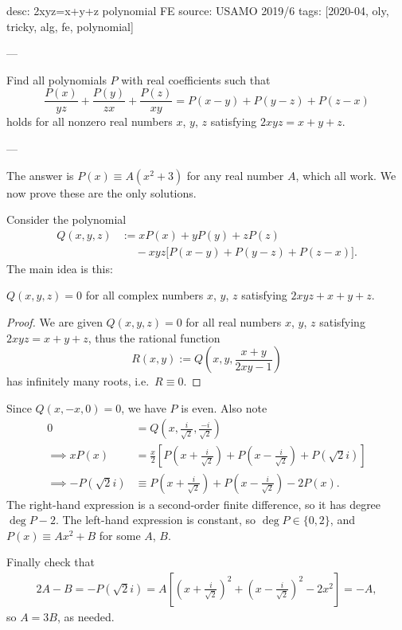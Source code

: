 desc: 2xyz=x+y+z polynomial FE
source: USAMO 2019/6
tags: [2020-04, oly, tricky, alg, fe, polynomial]

---

Find all polynomials $P$ with real coefficients such that \[\frac{P(x)}{yz}+\frac{P(y)}{zx}+\frac{P(z)}{xy}=P(x-y)+P(y-z)+P(z-x)\]
holds for all nonzero real numbers $x$, $y$, $z$ satisfying $2xyz=x+y+z$.

---

The answer is $P(x)\equiv A(x^2+3)$ for any real number $A$, which all work. We now prove these are the only solutions.

Consider the polynomial
\begin{align*}
    Q(x,y,z)&:=xP(x)+yP(y)+zP(z)\\
    &\;\quad-xyz\big[P(x-y)+P(y-z)+P(z-x)\big].
\end{align*}
The main idea is this:
\begin{claim*}
    $Q(x,y,z)=0$ for all complex numbers $x$, $y$, $z$ satisfying $2xyz+x+y+z$.
\end{claim*}
\begin{proof}
We are given $Q(x,y,z)=0$ for all real numbers $x$, $y$, $z$ satisfying $2xyz=x+y+z$, thus the rational function \[R(x,y):=Q\left(x,y,\frac{x+y}{2xy-1}\right)\]
has infinitely many roots, i.e.\ $R\equiv0$.
\end{proof}

Since $Q(x,-x,0)=0$, we have $P$ is even. Also note
\begin{align*}
    0&=Q\left(x,\frac i{\sqrt2},\frac{-i}{\sqrt2}\right)\\
    \implies xP(x)&=\frac x2\left[P\left(x+\frac i{\sqrt2}\right)+P\left(x-\frac i{\sqrt2}\right)+P(\sqrt2i)\right]\\
    \implies-P(\sqrt2i)&\equiv P\left(x+\frac i{\sqrt2}\right)+P\left(x-\frac i{\sqrt2}\right)-2P(x).
\end{align*}
The right-hand expression is a second-order finite difference, so it has degree $\deg P-2$. The left-hand expression is constant, so $\deg P\in\{0,2\}$, and $P(x)\equiv Ax^2+B$ for some $A$, $B$.

Finally check that
\begin{align*}
    2A-B=-P(\sqrt2i)=A\left[\left(x+\frac i{\sqrt2}\right)^2+\left(x-\frac i{\sqrt2}\right)^2-2x^2\right]=-A,
\end{align*}
so $A=3B$, as needed.
